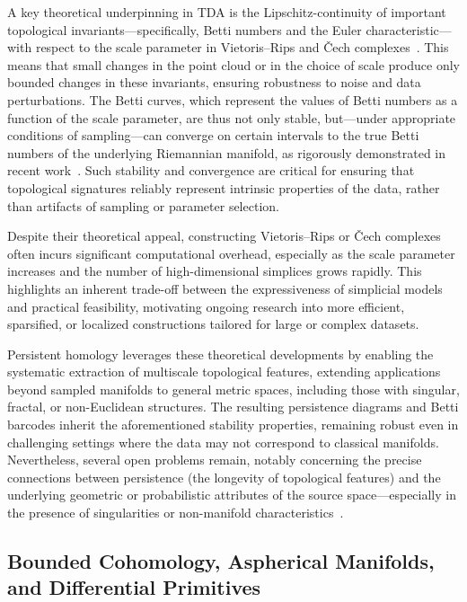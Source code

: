 \documentclass[sigconf]{acmart}
\begin{document}
A key theoretical underpinning in TDA is the Lipschitz-continuity of important topological invariants—specifically, Betti numbers and the Euler characteristic—with respect to the scale parameter in Vietoris–Rips and Čech complexes~\cite{ref88}. This means that small changes in the point cloud or in the choice of scale produce only bounded changes in these invariants, ensuring robustness to noise and data perturbations. The Betti curves, which represent the values of Betti numbers as a function of the scale parameter, are thus not only stable, but—under appropriate conditions of sampling—can converge on certain intervals to the true Betti numbers of the underlying Riemannian manifold, as rigorously demonstrated in recent work~\cite{ref88}. Such stability and convergence are critical for ensuring that topological signatures reliably represent intrinsic properties of the data, rather than artifacts of sampling or parameter selection.

Despite their theoretical appeal, constructing Vietoris–Rips or Čech complexes often incurs significant computational overhead, especially as the scale parameter increases and the number of high-dimensional simplices grows rapidly. This highlights an inherent trade-off between the expressiveness of simplicial models and practical feasibility, motivating ongoing research into more efficient, sparsified, or localized constructions tailored for large or complex datasets.

Persistent homology leverages these theoretical developments by enabling the systematic extraction of multiscale topological features, extending applications beyond sampled manifolds to general metric spaces, including those with singular, fractal, or non-Euclidean structures. The resulting persistence diagrams and Betti barcodes inherit the aforementioned stability properties, remaining robust even in challenging settings where the data may not correspond to classical manifolds. Nevertheless, several open problems remain, notably concerning the precise connections between persistence (the longevity of topological features) and the underlying geometric or probabilistic attributes of the source space—especially in the presence of singularities or non-manifold characteristics~\cite{ref88}.

\subsection{Bounded Cohomology, Aspherical Manifolds, and Differential Primitives}
\end{document}
